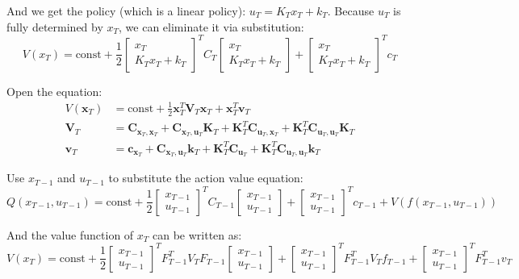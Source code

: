 \documentclass[10pt]{elegantbook}
\begin{document}
And we get the policy (which is a linear policy): $u_T = K_Tx_T + k_T$. Because $u_T$ is fully
determined by $x_T$, we can eliminate it via substitution:
\[ V(x_T) = \text{const} + \frac{1}{2} 
\begin{bmatrix}
    x_T \\ 
    K_Tx_T + k_T
\end{bmatrix}^T C_T
\begin{bmatrix}
    x_T \\ 
    K_Tx_T + k_T
\end{bmatrix}
+
\begin{bmatrix}
    x_T \\ 
    K_Tx_T + k_T
\end{bmatrix}^T
c_T
\]

Open the equation:
\begin{align*}
V(\bm{x}_T) &= \text{const} + \frac{1}{2} \bm{x}_T^T \bm{V}_T \bm{x}_T + \bm{x}_T^T \bm{v}_T \\
\bm{V}_T &= \bm{C}_{\bm{x}_T,\bm{x}_T} + \bm{C}_{\bm{x}_T,\bm{u}_T} \bm{K}_T + \bm{K}_T^T \bm{C}_{\bm{u}_T,\bm{x}_T} + \bm{K}_T^T \bm{C}_{\bm{u}_T,\bm{u}_T} \bm{K}_T \\
\bm{v}_T &= \bm{c}_{\bm{x}_T} + \bm{C}_{\bm{x}_T,\bm{u}_T} \bm{k}_T + \bm{K}_T^T \bm{C}_{\bm{u}_T} + \bm{K}_T^T \bm{C}_{\bm{u}_T,\bm{u}_T} \bm{k}_T
\end{align*}

Use $x_{T-1}$ and $u_{T-1}$ to substitute the action value equation:
\[ Q(x_{T-1}, u_{T-1}) = \text{const} +
\frac{1}{2} 
\begin{bmatrix}
    x_{T-1} \\ 
    u_{T-1}
\end{bmatrix}^T C_{T-1}
\begin{bmatrix}
    x_{T-1} \\ 
    u_{T-1}
\end{bmatrix} + 
\begin{bmatrix}
    x_{T-1} \\ 
    u_{T-1}
\end{bmatrix}^T c_{T-1}
+
V(f(x_{T-1}, u_{T-1}))
\]

And the value function of $x_T$ can be written as:
\[ 
V(x_T) = \text{const} + \frac{1}{2}
\begin{bmatrix}
x_{T-1} \\
u_{T-1}
\end{bmatrix}^T
F_{T-1}^T V_T F_{T-1}
\begin{bmatrix}
x_{T-1} \\
u_{T-1}
\end{bmatrix}
+ \begin{bmatrix}
x_{T-1} \\
u_{T-1}
\end{bmatrix}^T F_{T-1}^T V_T f_{T-1}
+ \begin{bmatrix}
x_{T-1} \\
u_{T-1}
\end{bmatrix}^T F_{T-1}^T v_T
\]
\end{document}

